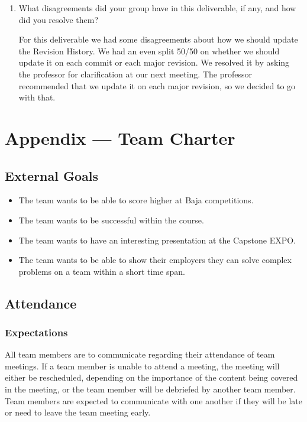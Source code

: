 \documentclass{article}
\begin{document}
\begin{enumerate}
    \item What disagreements did your group have in this deliverable, if any,
    and how did you resolve them?

    For this deliverable we had some disagreements about how we should update the Revision History.
    We had an even split 50/50 on whether we should update it on each commit or each major revision.
    We resolved it by asking the professor for clarification at our next meeting.
    The professor recommended that we update it on each major revision, so we decided to go with that.

    
\end{enumerate}

\newpage{}

\section*{Appendix --- Team Charter}

\subsection*{External Goals}

\begin{itemize}
  \item The team wants to be able to score higher at Baja competitions.
  \item The team wants to be successful within the course.
  \item The team wants to have an interesting presentation at the Capstone EXPO.
  \item The team wants to be able to show their employers they can solve complex problems on a team within a short time span.
\end{itemize}

\subsection*{Attendance}

\subsubsection*{Expectations}

All team members are to communicate regarding their attendance of team meetings.
If a team member is unable to attend a meeting, the meeting will either be rescheduled, depending on the importance of the content being covered in the meeting, or the team member will be debriefed by another team member. 
Team members are expected to communicate with one another if they will be late or need to leave the team meeting early. 
\end{document}
